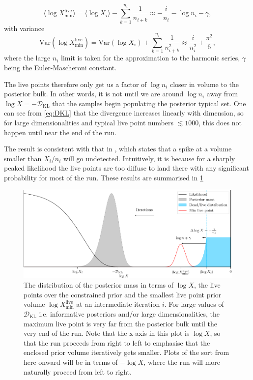 \documentclass[usenatbib]{mnras}
\newcommand{\nlive}{n_i}
\newcommand{\DKL}{\mathcal{D}_\mathrm{KL}}
\begin{document}
\begin{equation}\label{eq:Xmin}
    \langle\log X_\mathrm{min}^{\mathrm{live}}\rangle = \langle\log X_i\rangle - \sum_{k=1}^{\nlive} \frac{1}{n_{i+k}} \approx -\frac{i}{\nlive} - \log \nlive - \gamma,
\end{equation}
with variance
\begin{equation}
    \mathrm{Var}(\log X_\mathrm{min}^{\mathrm{live}}) = \mathrm{Var}(\log X_i) + \sum_{k=1}^{\nlive} \frac{1}{n_{i+k}^2} \approx \frac{i}{\nlive^2} + \frac{\pi^2}{6}, 
\end{equation}
where the large $\nlive$ limit is taken for the approximation to the harmonic series, $\gamma$ being the Euler-Mascheroni constant.
\par
The live points therefore only get us a factor of $\log \nlive$ closer in volume to the posterior bulk. In other words, it is not until we are around $\log \nlive$ away from $\log X = -\DKL$ that the samples begin populating the posterior typical set. One can see from \eqref{eq:DKL} that the divergence increases linearly with dimension, so for large dimensionalities and typical live point numbers $\lesssim 1000$, this does not happen until near the end of the run.
\par
The result is consistent with that in \citet{statmech}, which states that a spike at a volume smaller than $X_i/n_i$ will go undetected. Intuitively, it is because for a sharply peaked likelihood the live points are too diffuse to land there with any significant probability for most of the run. These results are summarised in \cref{fig:logX_distribution}
\begin{figure}
\begin{center}
    \includegraphics{figures/logX_distribution.pdf}
\end{center}
\caption{The distribution of the posterior mass in terms of $\log X$, the live points over the constrained prior and the smallest live point prior volume $\log X_\mathrm{min}^{\mathrm{live}}$ at an intermediate iteration $i$. For large values of $\DKL$ i.e. informative posteriors and/or large dimensionalities, the maximum live point is very far from the posterior bulk until the very end of the run. Note that the x-axis in this plot is $\log X$, so that the run proceeds from right to left to emphasise that the enclosed prior volume iteratively gets smaller. Plots of the sort from here onward will be in terms of $-\log X$, where the run will more naturally proceed from left to right. }
\label{fig:logX_distribution}
\end{figure}
\end{document}
